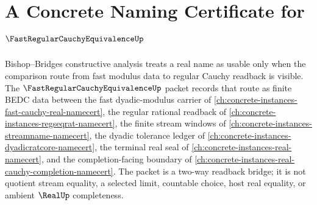 \chapter{A Concrete Naming Certificate for $\FastRegularCauchyEquivalenceUp$}
\label{ch:concrete-instances-fast-regular-cauchy-equivalence-namecert}

Bishop--Bridges constructive analysis treats a real name as usable only when the comparison route from fast modulus data to regular Cauchy readback is visible. The $\FastRegularCauchyEquivalenceUp$ packet records that route as finite BEDC data between the fast dyadic-modulus carrier of \autoref{ch:concrete-instances-fast-cauchy-real-namecert}, the regular rational readback of \autoref{ch:concrete-instances-regseqrat-namecert}, the finite stream windows of \autoref{ch:concrete-instances-streamname-namecert}, the dyadic tolerance ledger of \autoref{ch:concrete-instances-dyadicratcore-namecert}, the terminal real seal of \autoref{ch:concrete-instances-real-namecert}, and the completion-facing boundary of \autoref{ch:concrete-instances-real-cauchy-completion-namecert}. The packet is a two-way readback bridge; it is not quotient stream equality, a selected limit, countable choice, host real equality, or ambient $\RealUp$ completeness.

